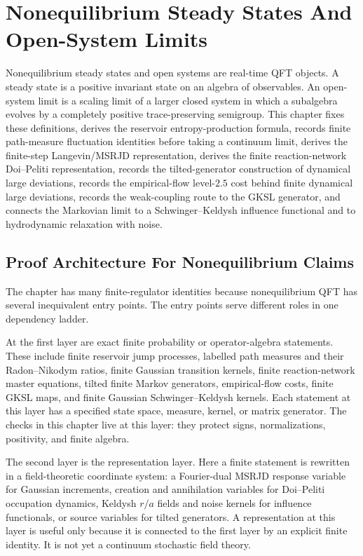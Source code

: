\chapter{Nonequilibrium Steady States And Open-System Limits}
\label{ch:thermal-nonequilibrium-steady-states-open-systems}

\ConventionsRealTime

Nonequilibrium steady states and open systems are real-time QFT objects.  A
steady state is a positive invariant state on an algebra of observables.  An
open-system limit is a scaling limit of a larger closed system in which a
subalgebra evolves by a completely positive trace-preserving semigroup.  This
chapter fixes these definitions, derives the reservoir entropy-production
formula, records finite path-measure fluctuation identities before taking a
continuum limit, derives the finite-step Langevin/MSRJD representation,
derives the finite reaction-network Doi--Peliti representation, records the
tilted-generator construction of dynamical large deviations, records the
empirical-flow level-\(2.5\) cost behind finite dynamical large deviations,
records the weak-coupling route to the GKSL generator, and connects the
Markovian limit
to a Schwinger--Keldysh influence functional and to hydrodynamic relaxation
with noise.

\section{Proof Architecture For Nonequilibrium Claims}
\label{sec:nonequilibrium-proof-architecture}

The chapter has many finite-regulator identities because nonequilibrium QFT
has several inequivalent entry points.  The entry points serve different
roles in one dependency ladder.

At the first layer are exact finite probability or operator-algebra
statements.  These include finite reservoir jump processes, labelled path
measures and their Radon--Nikodym ratios, finite Gaussian transition kernels,
finite reaction-network master equations, tilted finite Markov generators,
empirical-flow costs, finite GKSL maps, and finite Gaussian
Schwinger--Keldysh kernels.  Each statement at this layer has a specified
state space, measure, kernel, or matrix generator.  The checks in this chapter
live at this layer: they protect signs, normalizations, positivity, and
finite algebra.

The second layer is the representation layer.  Here a finite statement is
rewritten in a field-theoretic coordinate system: a Fourier-dual MSRJD
response variable for Gaussian increments, creation and annihilation variables
for Doi--Peliti occupation dynamics, Keldysh \(r/a\) fields and noise
kernels for influence functionals, or source variables for tilted
generators.  A representation at this layer is useful only because it is
connected to the first layer by an explicit finite identity.  It is not yet a
continuum stochastic field theory.

